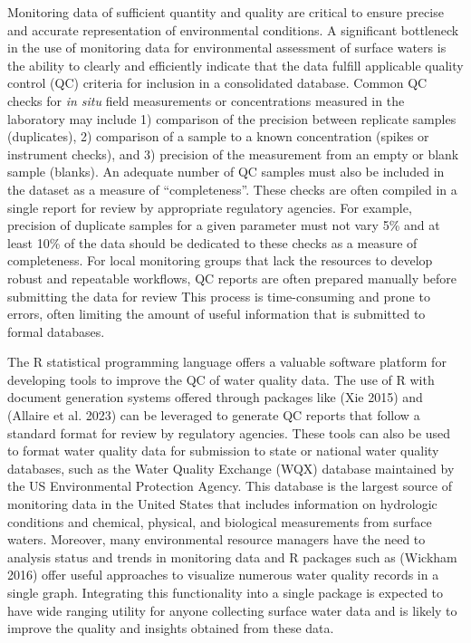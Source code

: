 Monitoring data of sufficient quantity and quality are critical to ensure precise and accurate representation of environmental conditions. A significant bottleneck in the use of monitoring data for environmental assessment of surface waters is the ability to clearly and efficiently indicate that the data fulfill applicable quality control (QC) criteria for inclusion in a consolidated database. Common QC checks for \emph{in situ} field measurements or concentrations measured in the laboratory may include 1) comparison of the precision between replicate samples (duplicates), 2) comparison of a sample to a known concentration (spikes or instrument checks), and 3) precision of the measurement from an empty or blank sample (blanks). An adequate number of QC samples must also be included in the dataset as a measure of ``completeness''. These checks are often compiled in a single report for review by appropriate regulatory agencies. For example, precision of duplicate samples for a given parameter must not vary 5\% and at least 10\% of the data should be dedicated to these checks as a measure of completeness. For local monitoring groups that lack the resources to develop robust and repeatable workflows, QC reports are often prepared manually before submitting the data for review This process is time-consuming and prone to errors, often limiting the amount of useful information that is submitted to formal databases.

The R statistical programming language offers a valuable software platform for developing tools to improve the QC of water quality data. The use of R with document generation systems offered through packages like  (Xie 2015) and  (Allaire et al. 2023) can be leveraged to generate QC reports that follow a standard format for review by regulatory agencies. These tools can also be used to format water quality data for submission to state or national water quality databases, such as the Water Quality Exchange (WQX) database maintained by the US Environmental Protection Agency. This database is the largest source of monitoring data in the United States that includes information on hydrologic conditions and chemical, physical, and biological measurements from surface waters. Moreover, many environmental resource managers have the need to analysis status and trends in monitoring data and R packages such as  (Wickham 2016) offer useful approaches to visualize numerous water quality records in a single graph. Integrating this functionality into a single package is expected to have wide ranging utility for anyone collecting surface water data and is likely to improve the quality and insights obtained from these data.

